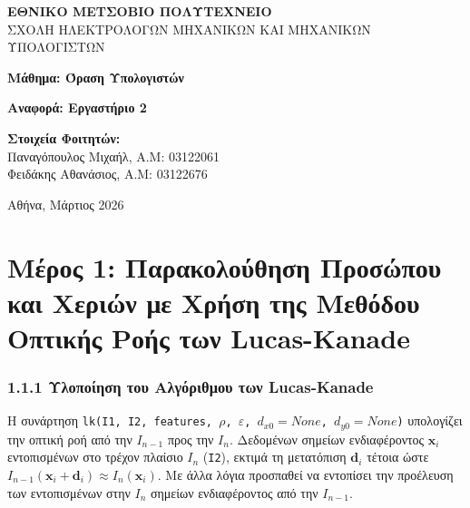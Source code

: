 \documentclass[12pt]{article}
\begin{document}
\begin{titlepage}
    \begin{center}
        \vspace*{1cm}
        
        
        \Large
        \textbf{ΕΘΝΙΚΟ ΜΕΤΣΟΒΙΟ ΠΟΛΥΤΕΧΝΕΙΟ}\\
        \large
        ΣΧΟΛΗ ΗΛΕΚΤΡΟΛΟΓΩΝ ΜΗΧΑΝΙΚΩΝ ΚΑΙ ΜΗΧΑΝΙΚΩΝ ΥΠΟΛΟΓΙΣΤΩΝ\\[1.5cm]
        
        \vfill
        
        \Large
        \textbf{Μάθημα: Όραση Υπολογιστών}\\[0.5cm]
        
        \vfill
        
        \huge
        \textbf{Αναφορά: Εργαστήριο 2}\\[2cm]
        
        \vfill
        
        \Large
        \textbf{Στοιχεία Φοιτητών:}\\[0.5cm]
        \large
        Παναγόπουλος Μιχαήλ, Α.Μ: 03122061\\
        Φειδάκης Αθανάσιος, Α.Μ: 03122676\\[2cm]
        
        \vfill
        
        \large
        Αθήνα, Μάρτιος 2026
        
    \end{center}
\end{titlepage}

\newpage

\section*{Μέρος 1: Παρακολούθηση Προσώπου και Χεριών με Χρήση
της Μεθόδου Οπτικής Ροής των Lucas-Kanade}


\subsubsection*{1.1.1 Υλοποίηση του Αλγόριθμου των Lucas-Kanade}

\hspace{0.6cm}Η συνάρτηση \texttt{lk(I1, I2, features, $\rho$, $\varepsilon$, $d_{x0}=None$, $d_{y0}=None$)} υπολογίζει την οπτική ροή από την $I_{n-1}$ προς την $Ι_{n}$. Δεδομένων σημείων ενδιαφέροντος $\mathbf{x}_i$ εντοπισμένων στο τρέχον πλαίσιο $I_n$ (\texttt{I2}), εκτιμά τη μετατόπιση $\mathbf{d}_i$ τέτοια ώστε $I_{n-1}(\mathbf{x}_i + \mathbf{d}_i) \approx I_n(\mathbf{x}_i)$. Με άλλα λόγια προσπαθεί να εντοπίσει την προέλευση των εντοπισμένων στην $I_{n}$ σημείων ενδιαφέροντος από την $Ι_{n-1}$. 
\end{document}
